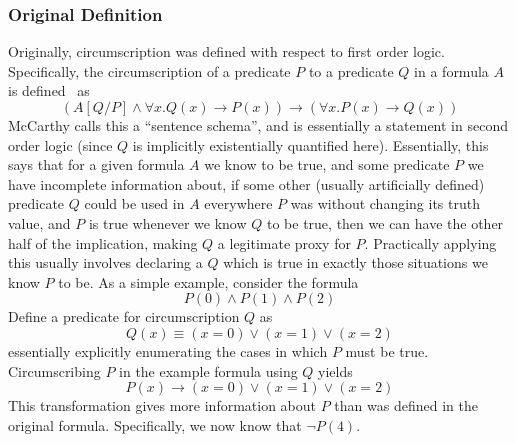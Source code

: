 \subsubsection{Original Definition}
Originally, circumscription was defined with respect to first order logic.
Specifically, the circumscription of a predicate $P$ to a predicate $Q$ in a formula $A$ is defined~\cite{circumscription} as
\[
(A [Q/P] \wedge \forall x. Q(x) \rightarrow P(x)) \rightarrow (\forall x. P(x) \rightarrow Q(x))
\]
McCarthy calls this a ``sentence schema'', and is essentially a statement in second order logic (since $Q$ is implicitly existentially quantified here).
Essentially, this says that for a given formula $A$ we know to be true, and some predicate $P$ we have incomplete information about, if some other (usually artificially defined) predicate $Q$ could be used in $A$ everywhere $P$ was without changing its truth value, and $P$ is true whenever we know $Q$ to be true, then we can have the other half of the implication, making $Q$ a legitimate proxy for $P$.
Practically applying this usually involves declaring a $Q$ which is true in exactly those situations we know $P$ to be.
As a simple example, consider the formula
\[
        P(0) \wedge P(1) \wedge P(2)
\]
Define a predicate for circumscription $Q$ as
\[
        Q(x) \equiv (x = 0) \vee (x = 1) \vee (x = 2)
\]
essentially explicitly enumerating the cases in which $P$ must be true.
Circumscribing $P$ in the example formula using $Q$ yields
\[
        P(x) \rightarrow (x = 0) \vee (x = 1) \vee (x = 2)
\]
This transformation gives more information about $P$ than was defined in the original formula.
Specifically, we now know that $\neg P(4)$.


